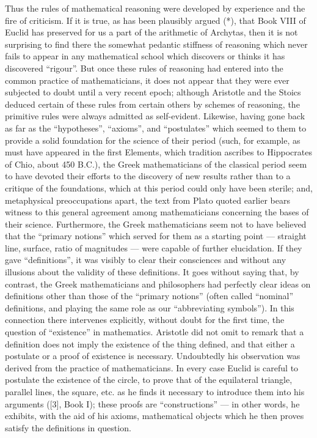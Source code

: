 Thus the rules of mathematical reasoning were developed by experience and the fire of criticism. If it is true, as has been plausibly argued (*), that Book VIII of Euclid has preserved for us a part of the arithmetic of Archytas, then it is not surprising to find there the somewhat pedantic stiffness of reasoning which never fails to appear in any mathematical school which discovers or thinks it has discovered ``rigour''. But once these rules of reasoning had entered into the common practice of mathematicians, it does not appear that they were ever subjected to doubt until a very recent epoch; although Aristotle and the Stoics deduced certain of these rules from certain others by schemes of reasoning, the primitive rules were always admitted as self-evident. Likewise, having gone back as far as the ``hypotheses'', ``axioms'', and ``postulates'' which seemed to them to provide a solid foundation for the science of their period (such, for example, as must have appeared in the first Elements, which tradition ascribes to Hippocrates of Chio, about 450 B.C.), the Greek mathematicians of the classical period seem to have devoted their efforts to the discovery of new results rather than to a critique of the foundations, which at this period could only have been sterile; and, metaphysical preoccupations apart, the text from Plato quoted earlier bears witness to this general agreement among mathematicians concerning the bases of their science. Furthermore, the Greek mathematicians seem not to have believed that the ``primary notions'' which served for them as a starting point --- straight line, surface, ratio of magnitudes --- were capable of further elucidation. If they gave ``definitions'', it was visibly to clear their consciences and without any illusions about the validity of these definitions. It goes without saying that, by contrast, the Greek mathematicians and philosophers had perfectly clear ideas on definitions other than those of the ``primary notions'' (often called ``nominal'' definitions, and playing the same role as our ``abbreviating symbols''). In this connection there intervenes explicitly, without doubt for the first time, the question of ``existence'' in mathematics. Aristotle did not omit to remark that a definition does not imply the existence of the thing defined, and that either a postulate or a proof of existence is necessary. Undoubtedly his observation was derived from the practice of mathematicians. In every case Euclid is careful to postulate the existence of the circle, to prove that of the equilateral triangle, parallel lines, the square, etc. as he finds it necessary to introduce them into his arguments ({[}3{]}, Book I); these proofs are ``constructions'' --- in other words, he exhibits, with the aid of his axioms, mathematical objects which he then proves satisfy the definitions in question.

